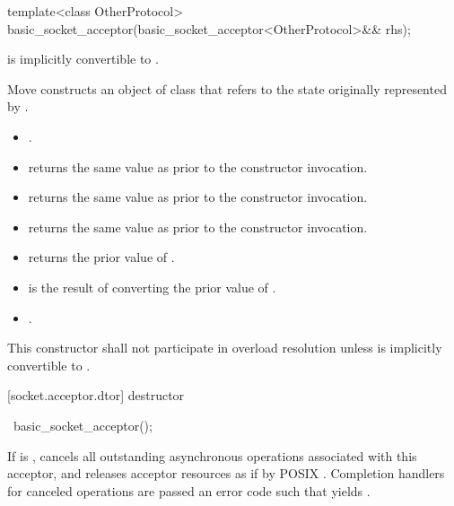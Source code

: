 \begin{itemdecl}
template<class OtherProtocol>
  basic_socket_acceptor(basic_socket_acceptor<OtherProtocol>&& rhs);
\end{itemdecl}

\begin{itemdescr}
\pnum
\requires {} is implicitly convertible to .

\pnum
\effects Move constructs an object of class  that refers to the state originally represented by .

\pnum
\postconditions
\begin{itemize}
\item
{}.
\item
{} returns the same value as  prior to the constructor invocation.
\item
{} returns the same value as  prior to the constructor invocation.
\item
{} returns the same value as  prior to the constructor invocation.
\item
{} returns the prior value of .
\item
{} is the result of converting the prior value of .
\item
{}.
\end{itemize}

\pnum
\remarks This constructor shall not participate in overload resolution unless  is implicitly convertible to .
\end{itemdescr}



[socket.acceptor.dtor]{ destructor}

\begin{itemdecl}
~basic_socket_acceptor();
\end{itemdecl}

\begin{itemdescr}
\pnum
\effects If  is , cancels all outstanding asynchronous operations associated with this acceptor, and releases acceptor resources as if by POSIX . Completion handlers for canceled operations are passed an error code  such that  yields .
\end{itemdescr}




